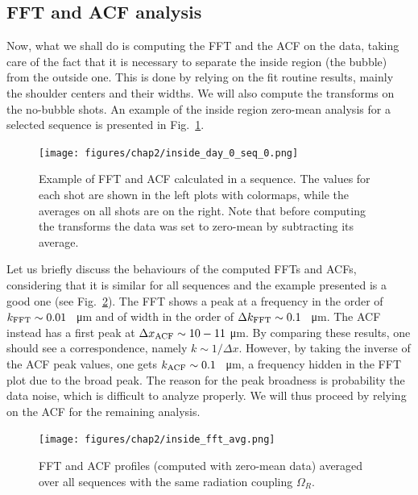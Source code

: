 \subsection{FFT and ACF analysis}
Now, what we shall do is computing the FFT and the ACF on the data, taking care of the fact that it is necessary to separate the inside region (the bubble) from the outside one. This is done by relying on the fit routine results, mainly the shoulder centers and their widths.
We will also compute the transforms on the no-bubble shots. An example of the inside region zero-mean analysis for a selected sequence is presented in Fig.\ \ref{fig:inside_00}.
\begin{figure}[h!]
    \centering
    \texttt{[image: figures/chap2/inside\_day\_0\_seq\_0.png]}
    \caption{Example of FFT and ACF calculated in a sequence. The values for each shot are shown in the left plots with colormaps, while the averages on all shots are on the right. Note that before computing the transforms the data was set to zero-mean by subtracting its average.}
    \label{fig:inside_00}
\end{figure}

Let us briefly discuss the behaviours of the computed FFTs and ACFs, considering that it is similar for all sequences and the example presented is a good one (see Fig.\ \ref{fig:inside_avg}). The FFT shows a peak at a frequency in the order of $k_{\rm FFT} \sim 0.01$ \unit{\per\micro\meter} and of width in the order of $\Delta k_{\rm FFT} \sim 0.1$ \unit{\per\micro\meter}. The ACF instead has a first peak at $\Delta x_{\rm ACF} \sim 10-11$ \unit{\micro\meter}. By comparing these results, one should see a correspondence, namely $k \sim 1/\Delta x$. However, by taking the inverse of the ACF peak values, one gets $k_{\rm ACF} \sim 0.1$ \unit{\per\micro\meter}, a frequency hidden in the FFT plot due to the broad peak. The reason for the peak broadness is probability the data noise, which is difficult to analyze properly. We will thus proceed by relying on the ACF for the remaining analysis.

\begin{figure}[t!]
    \centering
    \texttt{[image: figures/chap2/inside\_fft\_avg.png]}
    \caption{FFT and ACF profiles (computed with zero-mean data) averaged over all sequences with the same radiation coupling $\Omega_R$.}
    \label{fig:inside_avg}
\end{figure}

